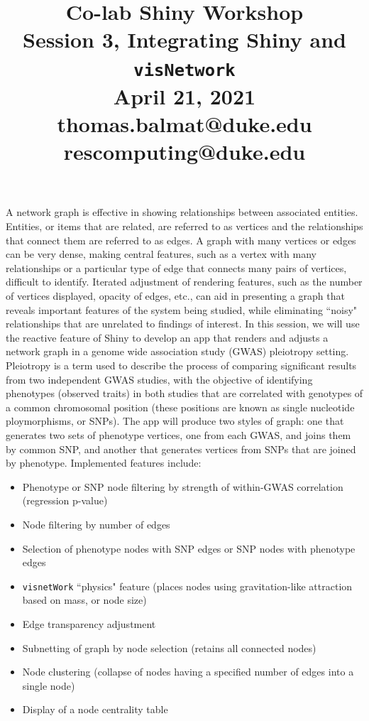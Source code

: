 \documentclass[10pt, letterpaper]{article}
\title{\Large Co-lab Shiny Workshop\\[6pt]
       \large Session 3, Integrating Shiny and \texttt{visNetwork}\\[6pt]
       April 21, 2021\\[20pt]
       \normalsize thomas.balmat@duke.edu\\[1pt]rescomputing@duke.edu}
\date{}
\begin{document}
    
\begin{spacing}{1.0}
    
\maketitle

\vspace{-20pt}


A network graph is effective in showing relationships between associated entities.  Entities, or items that are related, are referred to as vertices and the relationships that connect them are referred to as edges.  A graph with many vertices or edges can be very dense, making central features, such as a vertex with many relationships or a particular type of edge that connects many pairs of vertices, difficult to identify.  Iterated adjustment of rendering features, such as the number of vertices displayed, opacity of edges, etc., can aid in presenting a graph that reveals important features of the system being studied, while eliminating ``noisy" relationships that are unrelated to findings of interest.  In this session, we will use the reactive feature of Shiny to develop an app that renders and adjusts a network graph in a genome wide association study (GWAS) pleiotropy setting.  Pleiotropy is a term used to describe the process of comparing significant results from two independent GWAS studies, with the objective of identifying phenotypes (observed traits) in both studies that are correlated with genotypes of a common chromosomal position (these positions are known as single nucleotide ploymorphisms, or SNPs).  The app will produce two styles of graph:  one that generates two sets of phenotype vertices, one from each GWAS, and joins them by common SNP, and another that generates vertices from SNPs that are joined by phenotype.  Implemented features include:

\begin{itemize}[noitemsep]
    \item Phenotype or SNP node filtering by strength of within-GWAS correlation (regression p-value)
    \item Node filtering by number of edges
    \item Selection of phenotype nodes with SNP edges or SNP nodes with phenotype edges
    \item \texttt{visnetWork} ``physics" feature (places nodes using gravitation-like attraction based on mass, or node size)
    \item Edge transparency adjustment
    \item Subnetting of graph by node selection (retains all connected nodes)
    \item Node clustering (collapse of nodes having a specified number of edges into a single node)
    \item Display of a node centrality table
\end{itemize}


\end{spacing}
\end{document}
